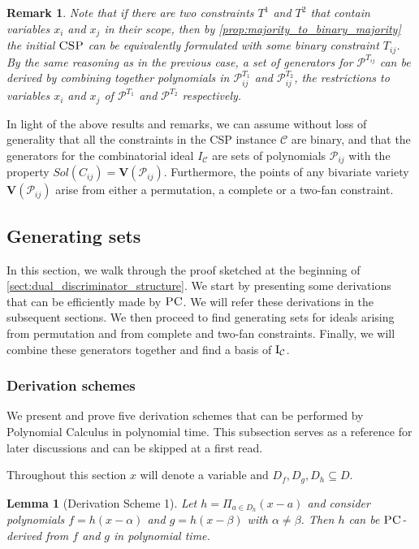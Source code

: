 \documentclass[11pt]{article}
\newcommand{\Cc}{\mathcal{C}}
\newcommand{\CSP}{\textsc{CSP}}
\newcommand{\PC}{\textsc{PC}}
\newcommand{\Variety}[1]{{\textbf{V}}\left( #1 \right)}
\newcommand{\I}{\emph{$\rm{I}$}}
\newcommand{\1}{\textbf{1}}
\newcommand{\GB}{\text{Gr\"{o}bner} }
\newtheorem{lemma}[theorem]{Lemma}
\newtheorem{remark}[theorem]{Remark}
\begin{document}
\begin{remark}
    Note that if there are two constraints $T^1$ and $T^2$ that contain variables $x_i$ and $x_j$ in their scope, then by \cref{prop:majority_to_binary_majority} the initial $\CSP$ can be equivalently formulated with some binary constraint $T_{ij}$. By the same reasoning as in the previous case, a set of generators for $\mathcal{P}^{T_{ij}}$ can be derived by combining together polynomials in $\mathcal{P}^{T_1}_{ij}$ and $\mathcal{P}^{T_2}_{ij}$, the restrictions to variables $x_i$ and $x_j$ of $\mathcal{P}^{T_1}$ and $\mathcal{P}^{T_2}$ respectively.
\end{remark}

In light of the above results and remarks, we can assume without loss of generality that all the constraints in the CSP instance $\Cc$ are binary, and that the generators for the combinatorial ideal $I_{\Cc}$ are sets of polynomials $\mathcal{P}_{ij}$ with the property $Sol(C_{ij}) = \Variety{\mathcal{P}_{ij}}$. Furthermore, the points of any bivariate variety $\Variety{\mathcal{P}_{ij}}$ arise from either a permutation, a complete or a two-fan constraint.

\subsection{Generating sets}

In this section, we walk through the proof sketched at the beginning of \cref{sect:dual_discriminator_structure}. We start by presenting some derivations that can be efficiently made by $\PC$. We will refer these derivations in the subsequent sections. We then proceed to find generating sets for ideals arising from permutation and from complete and two-fan constraints. Finally, we will combine these generators together and find a \GB basis of $\I_{\Cc}$.

\subsubsection{Derivation schemes}

We present and prove five derivation schemes that can be performed by Polynomial Calculus in polynomial time. This subsection serves as a reference for later discussions and can be skipped at a first read.

Throughout this section $x$ will denote a variable and $D_f, D_g, D_h \subseteq D$.

\begin{lemma}[Derivation Scheme 1]\label{th:derivation_scheme_1}
    Let $h = \Pi_{a \in D_h}(x-a)$ and consider polynomials $f = h(x-\alpha)$ and $g = h(x-\beta)$ with $\alpha \neq \beta$. Then $h$ can be $\PC$-derived from $f$ and $g$ in polynomial time.
\end{lemma}
\end{document}
